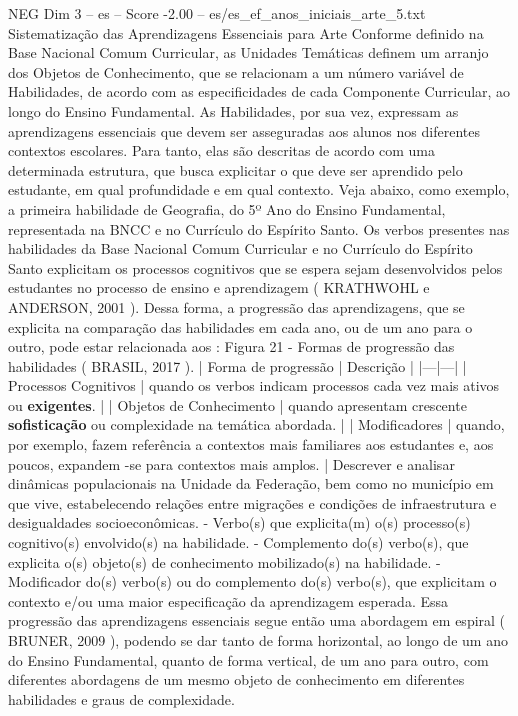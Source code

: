 \begin{textsample}{NEG Dim 3 – es – Score -2.00 – es/es\_ef\_anos\_iniciais\_arte\_5.txt}  \label{ex:f3_neg_174}
Sistematização das Aprendizagens Essenciais para Arte Conforme definido na Base Nacional Comum Curricular, as Unidades Temáticas definem um arranjo dos Objetos de Conhecimento, que se relacionam a um número variável de Habilidades, de acordo com as especificidades de cada Componente Curricular, ao longo do Ensino Fundamental.
As Habilidades, por sua vez, expressam as aprendizagens essenciais que devem ser asseguradas aos alunos nos diferentes contextos escolares.
Para tanto, elas são descritas de acordo com uma determinada estrutura, que busca explicitar o que deve ser aprendido pelo estudante, em qual profundidade e em qual contexto.
Veja abaixo, como exemplo, a primeira habilidade de Geografia, do 5º Ano do Ensino Fundamental, representada na BNCC e no Currículo do Espírito Santo.
Os verbos presentes nas habilidades da Base Nacional Comum Curricular e no Currículo do Espírito Santo explicitam os processos cognitivos que se espera sejam desenvolvidos pelos estudantes no processo de ensino e aprendizagem ( KRATHWOHL e ANDERSON, 2001 ).
Dessa forma, a progressão das aprendizagens, que se explicita na comparação das habilidades em cada ano, ou de um ano para o outro, pode estar relacionada aos : Figura 21 - Formas de progressão das habilidades ( BRASIL, 2017 ). | Forma de progressão | Descrição | |---|---| | Processos Cognitivos | quando os verbos indicam processos cada vez mais ativos ou \textbf{exigentes}. | | Objetos de Conhecimento | quando apresentam crescente \textbf{sofisticação} ou complexidade na temática abordada. | | Modificadores | quando, por exemplo, fazem referência a contextos mais familiares aos estudantes e, aos poucos, expandem -se para contextos mais amplos. | Descrever e analisar dinâmicas populacionais na Unidade da Federação, bem como no município em que vive, estabelecendo relações entre migrações e condições de infraestrutura e desigualdades socioeconômicas. - Verbo(s) que explicita(m) o(s) processo(s) cognitivo(s) envolvido(s) na habilidade. - Complemento do(s) verbo(s), que explicita o(s) objeto(s) de conhecimento mobilizado(s) na habilidade. - Modificador do(s) verbo(s) ou do complemento do(s) verbo(s), que explicitam o contexto e/ou uma maior especificação da aprendizagem esperada.
Essa progressão das aprendizagens essenciais segue então uma abordagem em espiral ( BRUNER, 2009 ), podendo se dar tanto de forma horizontal, ao longo de um ano do Ensino Fundamental, quanto de forma vertical, de um ano para outro, com diferentes abordagens de um mesmo objeto de conhecimento em diferentes habilidades e graus de complexidade.

\end{textsample}

